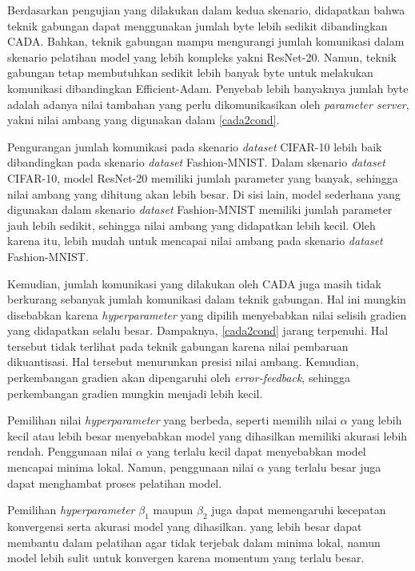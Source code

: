 Berdasarkan pengujian yang dilakukan dalam kedua skenario, didapatkan bahwa teknik gabungan dapat menggunakan jumlah byte lebih sedikit dibandingkan CADA. Bahkan, teknik gabungan mampu mengurangi jumlah komunikasi dalam skenario pelatihan model yang lebih kompleks yakni ResNet-20. Namun, teknik gabungan tetap membutuhkan sedikit lebih banyak byte untuk melakukan komunikasi dibandingkan Efficient-Adam. Penyebab lebih banyaknya jumlah byte adalah adanya nilai tambahan yang perlu dikomunikasikan oleh \emph{parameter server}, yakni nilai ambang yang digunakan dalam \autoref{cada2cond}.

Pengurangan jumlah komunikasi pada skenario \emph{dataset} CIFAR-10 lebih baik dibandingkan pada skenario \emph{dataset} Fashion-MNIST. Dalam skenario \emph{dataset} CIFAR-10, model ResNet-20 memiliki jumlah parameter yang banyak, sehingga nilai ambang yang dihitung akan lebih besar. Di sisi lain, model sederhana yang digunakan dalam skenario \emph{dataset} Fashion-MNIST memiliki jumlah parameter jauh lebih sedikit, sehingga nilai ambang yang didapatkan lebih kecil. Oleh karena itu, lebih mudah untuk mencapai nilai ambang pada skenario \emph{dataset} Fashion-MNIST.

Kemudian, jumlah komunikasi yang dilakukan oleh CADA juga masih tidak berkurang sebanyak jumlah komunikasi dalam teknik gabungan. Hal ini mungkin disebabkan karena \emph{hyperparameter} yang dipilih menyebabkan nilai selisih gradien yang didapatkan selalu besar. Dampaknya, \autoref{cada2cond} jarang terpenuhi. Hal tersebut tidak terlihat pada teknik gabungan karena nilai pembaruan dikuantisasi. Hal tersebut menurunkan presisi nilai ambang. Kemudian, perkembangan gradien akan dipengaruhi oleh \emph{error-feedback}, sehingga perkembangan gradien mungkin menjadi lebih kecil.

Pemilihan nilai \emph{hyperparameter} yang berbeda, seperti memilih nilai $\alpha$ yang lebih kecil atau lebih besar menyebabkan model yang dihasilkan memiliki akurasi lebih rendah. Penggunaan nilai $\alpha$ yang terlalu kecil dapat menyebabkan model mencapai minima lokal. Namun, penggunaan nilai $\alpha$ yang terlalu besar juga dapat menghambat proses pelatihan model.

Pemilihan \emph{hyperparameter} $\beta_1$ maupun $\beta_2$ juga dapat memengaruhi kecepatan konvergensi serta akurasi model yang dihasilkan. yang lebih besar dapat membantu dalam pelatihan agar tidak terjebak dalam minima lokal, namun model lebih sulit untuk konvergen karena momentum yang terlalu besar.


